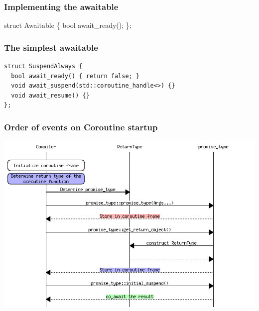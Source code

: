 \documentclass[aspectratio=169]{beamer}
\begin{document}
\begin{frame}[fragile]
  \frametitle{Implementing the awaitable}
  
  
  \begin{semiverbatim}
{\color{blue}struct} Awaitable \{
  {\color{blue}bool} await_ready();
\};
  \end{semiverbatim}
  
\end{frame}


\begin{frame}[fragile]
  \frametitle{The simplest awaitable}
  
  \begin{lstlisting}[style=cpp20]
struct SuspendAlways {
  bool await_ready() { return false; }
  void await_suspend(std::coroutine_handle<>) {}
  void await_resume() {}
};
  \end{lstlisting}
\end{frame}


\begin{frame}
  \frametitle{Order of events on Coroutine startup}

  \includegraphics[height=.9\textheight]{corogfx/start_flow.png}
\end{frame}
\end{document}
